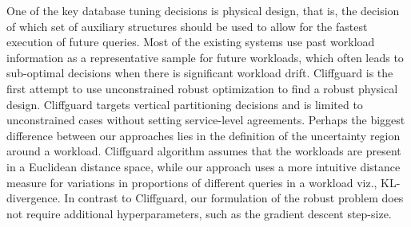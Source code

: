 One of the key database tuning decisions is 
physical design, that is, the decision of 
which set of auxiliary structures should be 
used to allow for the fastest execution of 
future queries. Most of the existing systems 
use past workload information as a 
representative sample for future workloads, 
which often leads to sub-optimal decisions when 
there is significant workload drift. 
Cliffguard \cite{Mozafari2015} is the first attempt to use
unconstrained robust optimization to find a robust physical design. Cliffguard targets
vertical partitioning decisions and is limited to unconstrained cases without setting 
service-level agreements. 
Perhaps the biggest difference between our approaches lies
    in the definition of the uncertainty region around a workload. 
Cliffguard algorithm assumes
    that the workloads are present in a Euclidean distance space, while our approach uses
    a more intuitive distance measure for variations in proportions of different
    queries in a workload viz., KL-divergence. 
In contrast to Cliffguard, our formulation of the robust problem does not 
    require additional hyperparameters, such as the gradient descent step-size.
    
%





